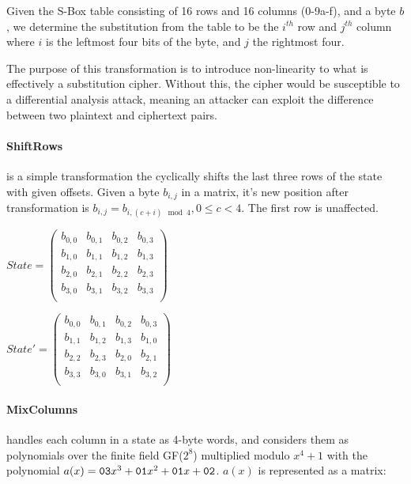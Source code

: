     Given the S-Box table consisting of 16 rows and 16 columns (0-9a-f), and a byte $b$, we determine the substitution from the table to be the $i^{th}$ row and $j^{th}$ column where $i$ is the leftmost four bits of the byte, and $j$ the rightmost four.
    
    The purpose of this transformation is to introduce non-linearity to what is effectively a substitution cipher. Without this, the cipher would be susceptible to a differential analysis attack, meaning an attacker can exploit the difference between two plaintext and ciphertext pairs.
    
    \paragraph{ShiftRows} is a simple transformation the cyclically shifts the last three rows of the state with given offsets. Given a byte $b_{i,j}$ in a matrix, it's new position after transformation is $b_{i,j} = b_{i,(c+i) \mod 4}, 0 \leq c < 4$. The first row is unaffected.
    
    \begin{center}
    $State = \begin{pmatrix}
      b_{0,0} & b_{0,1} & b_{0,2} & b_{0,3} \\
      b_{1,0} & b_{1,1} & b_{1,2} & b_{1,3} \\
      b_{2,0} & b_{2,1} & b_{2,2} & b_{2,3} \\
      b_{3,0} & b_{3,1} & b_{3,2} & b_{3,3} \\
    \end{pmatrix}$
    
    $State' = \begin{pmatrix}
      b_{0,0} & b_{0,1} & b_{0,2} & b_{0,3} \\
      b_{1,1} & b_{1,2} & b_{1,3} & b_{1,0} \\
      b_{2,2} & b_{2,3} & b_{2,0} & b_{2,1} \\
      b_{3,3} & b_{3,0} & b_{3,1} & b_{3,2} \\
    \end{pmatrix}$
    \end{center}
    
    \paragraph{MixColumns}
    
    handles each column in a state as 4-byte words, and considers them as polynomials over the finite field GF($2^8$) multiplied modulo $x^4 + 1$ with the polynomial $a(x) = \verb!03!x^3 + \verb!01!x^2 + \verb!01!x + \verb!02!$. $a(x)$ is represented as a matrix:
    
